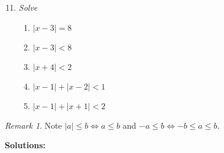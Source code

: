 \documentclass[12pt]{amsbook}
\theoremstyle{plain}
\numberwithin{section}{chapter}
\numberwithin{equation}{chapter}
\theoremstyle{definition}
\theoremstyle{remark}
\newtheorem{rem}[theorem]{Remark}
\theoremstyle{plain}
\renewcommand{\leq}{\leqslant}
\begin{document}
\begin{enumerate}[label=\arabic*.]
\setcounter{enumi}{10}
\item \textit{Solve}
\begin{enumerate}[label=\roman*)]
\item $|x - 3| = 8$
\item $|x - 3| < 8$
\item $|x + 4| < 2$
\item $|x - 1| + |x - 2| < 1$
\item $|x - 1| + |x + 1| < 2$
\end{enumerate}
\end{enumerate}
\begin{rem}
Note $|a| \leq b \Leftrightarrow a \leq b$ and $-a \leq b \Leftrightarrow -b \leq a \leq b$. 
\end{rem}
\textbf{Solutions:}
\end{document}
